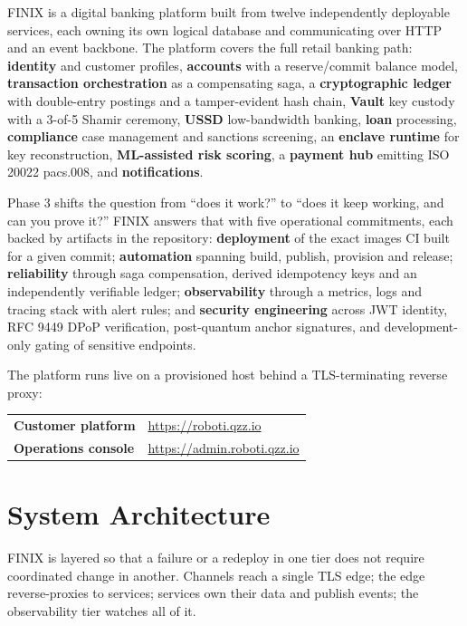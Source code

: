 \documentclass[11pt,a4paper]{article}
\begin{document}
FINIX is a digital banking platform built from twelve independently deployable services, each
owning its own logical database and communicating over HTTP and an event backbone. The platform
covers the full retail banking path: \textbf{identity} and customer profiles, \textbf{accounts}
with a reserve/commit balance model, \textbf{transaction orchestration} as a compensating saga, a
\textbf{cryptographic ledger} with double-entry postings and a tamper-evident hash chain,
\textbf{Vault} key custody with a 3-of-5 Shamir ceremony, \textbf{USSD} low-bandwidth banking,
\textbf{loan} processing, \textbf{compliance} case management and sanctions screening, an
\textbf{enclave runtime} for key reconstruction, \textbf{ML-assisted risk scoring},
a \textbf{payment hub} emitting ISO 20022 pacs.008, and \textbf{notifications}.

Phase 3 shifts the question from ``does it work?'' to ``does it keep working, and can you prove
it?'' FINIX answers that with five operational commitments, each backed by artifacts in the
repository: \textbf{deployment} of the exact images CI built for a given commit;
\textbf{automation} spanning build, publish, provision and release; \textbf{reliability} through
saga compensation, derived idempotency keys and an independently verifiable ledger;
\textbf{observability} through a metrics, logs and tracing stack with alert rules; and
\textbf{security engineering} across JWT identity, RFC 9449 DPoP verification, post-quantum
anchor signatures, and development-only gating of sensitive endpoints.

The platform runs live on a provisioned host behind a TLS-terminating reverse proxy:

\begin{center}
\begin{tabular}{@{}ll@{}}
\toprule
\textbf{Customer platform} & \url{https://roboti.qzz.io}\\
\textbf{Operations console} & \url{https://admin.roboti.qzz.io}\\
\bottomrule
\end{tabular}
\end{center}

\section{System Architecture}

FINIX is layered so that a failure or a redeploy in one tier does not require coordinated change
in another. Channels reach a single TLS edge; the edge reverse-proxies to services; services own
their data and publish events; the observability tier watches all of it.
\end{document}
